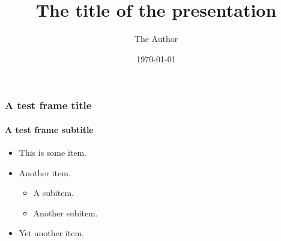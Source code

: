 \documentclass{beamer}
\title[The short title]{The title of the presentation}
\author{The Author}
\date{\today}
\begin{document}
\begin{frame}[plain]
\maketitle
\end{frame}

\begin{frame}
\frametitle{A test frame title}
\framesubtitle{A test frame subtitle}
\begin{itemize}
  \item This is some item.
  \item Another item.
  \begin{itemize}
    \item A subitem.
    \item Another subitem.
  \end{itemize}
  \item Yet another item.
\end{itemize}

\end{frame}
\end{document}
